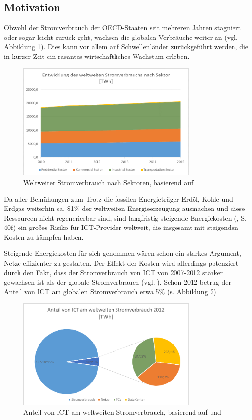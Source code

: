 \documentclass[12pt,titlepage]{article}
\begin{document}
\subsection{Motivation}
Obwohl der Stromverbrauch der OECD-Staaten seit mehreren Jahren stagniert oder sogar leicht zurück geht, wachsen die globalen Verbräuche weiter an (vgl. Abbildung \ref{fig:ProbStromSektor}). Dies kann vor allem auf  Schwellenländer zurückgeführt werden, die in kurzer Zeit ein rasantes wirtschaftliches Wachstum erleben.

\begin{figure}[!ht]
	\centering
	\includegraphics[width=0.8\textwidth]{ProbStromSektor}
	\caption{Weltweiter Stromverbrauch nach Sektoren, basierend auf \cite{bibid}}
	\label{fig:ProbStromSektor}
\end{figure}
Da aller Bemühungen zum Trotz die fossilen Energieträger Erdöl, Kohle und Erdgas weiterhin ca. 81\% der weltweiten Energieerzeugung ausmachen \cite{statista} und diese Ressourcen nicht regenerierbar sind, sind langfristig steigende Energiekosten (\cite{iea2015}, S. 40f) ein großes Risiko für ICT-Provider weltweit, die insgesamt mit steigenden Kosten zu kämpfen haben.

Steigende Energiekosten für sich genommen wären schon ein starkes Argument, Netze effizienter zu gestalten.  Der Effekt der Kosten wird allerdings potenziert durch den Fakt, dass der Stromverbrauch von ICT von 2007-2012 stärker gewachsen ist als der globale Stromverbrauch (vgl. \cite[9]{vanhedde}). Schon 2012 betrug der Anteil von ICT am globalen Stromverbrauch etwa 5\% (s. Abbildung \ref{fig:ProbStromICT})

\begin{figure}[!ht]
	\centering
	\includegraphics[width=0.8\textwidth]{ProbStromICT}
	\caption{Anteil von ICT am weltweiten Stromverbrauch, basierend auf \cite{bibid} und \cite{bibid}}
	\label{fig:ProbStromICT}
\end{figure}
\end{document}
